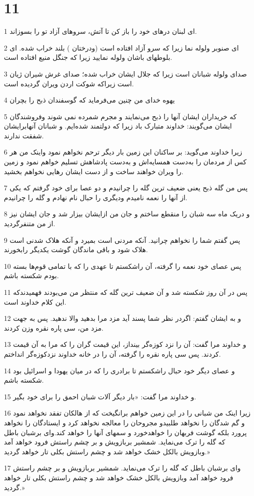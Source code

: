 \chapter{11}

\par 1 ای لبنان درهای خود را باز کن تا آتش، سروهای آزاد تو را بسوزاند.
\par 2 ‌ای صنوبر ولوله نما زیرا که سرو آزاد افتاده است (ودرختان ) بلند خراب شده. ای بلوطهای باشان ولوله نمایید زیرا که جنگل منیع افتاده است.
\par 3 صدای ولوله شبانان است زیرا که جلال ایشان خراب شده؛ صدای غرش شیران ژیان است زیراکه شوکت اردن ویران گردیده است.
\par 4 یهوه خدای من چنین می‌فرماید که گوسفندان ذبح را بچران
\par 5 که خریداران ایشان آنها را ذبح می‌نمایند و مجرم شمرده نمی شوند وفروشندگان ایشان می‌گویند: خداوند متبارک باد زیرا که دولتمند شده‌ایم. و شبانان آنهابرایشان شفقت ندارند.
\par 6 زیرا خداوند می‌گوید: بر ساکنان این زمین بار دیگر ترحم نخواهم نمود واینک من هر کس از مردمان را به‌دست همسایه‌اش و به‌دست پادشاهش تسلیم خواهم نمود و زمین را ویران خواهند ساخت و از دست ایشان رهایی نخواهم بخشید.
\par 7 پس من گله ذبح یعنی ضعیف ترین گله را چرانیدم و دو عصا برای خود گرفتم که یکی از آنها را نعمه نامیدم ودیگری را حبال نام نهادم و گله را چرانیدم.
\par 8 و دریک ماه سه شبان را منقطع ساختم و جان من ازایشان بیزار شد و جان ایشان نیز از من متنفرگردید.
\par 9 پس گفتم شما را نخواهم چرانید. آنکه مردنی است بمیرد و آنکه هلاک شدنی است هلاک شود و باقی ماندگان گوشت یکدیگر رابخورند.
\par 10 پس عصای خود نعمه را گرفته، آن راشکستم تا عهدی را که با تمامی قوم‌ها بسته بودم شکسته باشم.
\par 11 پس در آن روز شکسته شد و آن ضعیف ترین گله که منتظر من می‌بودند فهمیدندکه این کلام خداوند است.
\par 12 و به ایشان گفتم: اگردر نظر شما پسند آید مزد مرا بدهید والا ندهید. پس به جهت مزد من، سی پاره نقره وزن کردند.
\par 13 و خداوند مرا گفت: آن را نزد کوزه‌گر بینداز، این قیمت گران را که مرا به آن قیمت کردند. پس سی پاره نقره را گرفته، آن را در خانه خداوند نزدکوزه‌گر انداختم.
\par 14 و عصای دیگر خود حبال راشکستم تا برادری را که در میان یهودا و اسرائیل بود شکسته باشم.
\par 15 و خداوند مرا گفت: «بار دیگر آلات شبان احمق را برای خود بگیر.
\par 16 زیرا اینک من شبانی را در این زمین خواهم برانگیخت که از هالکان تفقد نخواهد نمود و گم شدگان را نخواهد طلبیدو مجروحان را معالجه نخواهد کرد و ایستادگان را نخواهد پرورد بلکه گوشت فربهان را خواهدخورد و سمهای آنها را خواهد کند.وای برشبان باطل که گله را ترک می‌نماید. شمشیر بربازویش و بر چشم راستش فرود خواهد آمد وبازویش بالکل خشک خواهد شد و چشم راستش بکلی تار خواهد گردید.»
\par 17 وای برشبان باطل که گله را ترک می‌نماید. شمشیر بربازویش و بر چشم راستش فرود خواهد آمد وبازویش بالکل خشک خواهد شد و چشم راستش بکلی تار خواهد گردید.»

